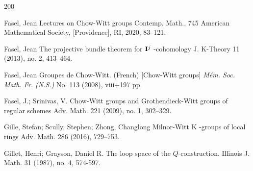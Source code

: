 \documentclass[12pt]{article}
\begin{document}
\begin{thebibliography}{200}

  Fasel, Jean
  Lectures on Chow-Witt groups
%
Contemp. Math., 745
American Mathematical Society, [Providence], RI, 2020, 83–121.

 Fasel, Jean
The projective bundle theorem for  ${\bf I}^j$ -cohomology
%
J. K-Theory 11 (2013), no. 2, 413–464.

Fasel, Jean Groupes de Chow-Witt. (French) [Chow-Witt groups] {\it M\'{e}m. Soc. Math. Fr. (N.S.)} No. 113 (2008), viii+197 pp.

 Fasel, J.; Srinivas, V.
Chow-Witt groups and Grothendieck-Witt groups of regular schemes
Adv. Math. 221 (2009), no. 1, 302–329.


  Gille, Stefan; Scully, Stephen; Zhong, Changlong
%
 Milnor-Witt  K -groups of local rings
Adv. Math. 286 (2016), 729–753.

 Gillet, Henri; Grayson, Daniel R. The loop space of the $Q$-construction. {\rm Illinois J. Math.} 31 (1987), no. 4, 574-597.
 

 
 
 







\end{thebibliography}
\end{document}
